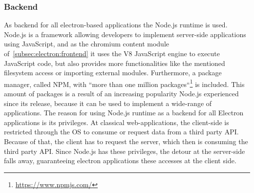 \subsubsection{Backend}
\label{subsec:electron:backend}
As backend for all electron-based applications the Node.js runtime is used.
Node.js is a framework allowing developers to implement server-side applications using JavaScript, and as the chromium content module of~\ref{subsec:electron:frontend} it uses the V8 JavaScript engine to execute JavaScript code, but also provides more functionalities like the mentioned filesystem access
or importing external modules.
Furthermore, a package manager, called \ac{NPM}, with ``more than one million packages``\footnote{\url{https://www.npmjs.com/}} is included.
This amount of packages is a result of an increasing popularity Node.js experienced since its release, because it can be used to implement a wide-range of applications.
The reason for using Node.js runtime as a backend for all Electron applications is its privileges.
At classical web-applications, the client-side is restricted through the OS to consume or request data from a third party API\@.
Because of that, the client has to request the server, which then is consuming the third party API\@.
Since Node.js has these privileges, the detour at the server-side falls away, guaranteeing electron applications these accesses at the client side.



